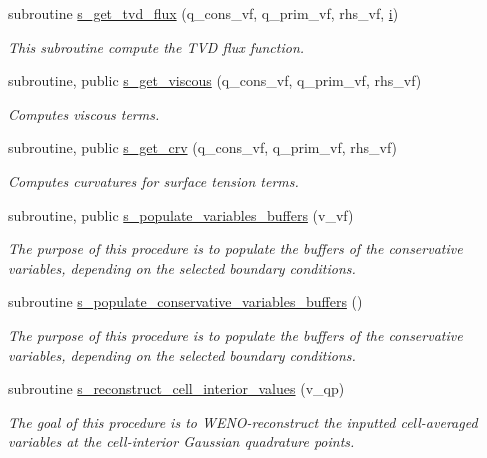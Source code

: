 \begin{DoxyCompactItemize}
\item 
subroutine \hyperlink{namespacem__rhs_a6b6be41d990e9bda7c4830531d7c3470}{s\+\_\+get\+\_\+tvd\+\_\+flux} (q\+\_\+cons\+\_\+vf, q\+\_\+prim\+\_\+vf, rhs\+\_\+vf, \hyperlink{m__rhs_8f90_aaea4baed8fd8b780f6938f0dc1fb0f72}{i})
\begin{DoxyCompactList}\small\item\em This subroutine compute the T\+VD flux function. \end{DoxyCompactList}\item 
subroutine, public \hyperlink{namespacem__rhs_aac41721bd3275fb997f51c1afaebac4a}{s\+\_\+get\+\_\+viscous} (q\+\_\+cons\+\_\+vf, q\+\_\+prim\+\_\+vf, rhs\+\_\+vf)
\begin{DoxyCompactList}\small\item\em Computes viscous terms. \end{DoxyCompactList}\item 
subroutine, public \hyperlink{namespacem__rhs_ae70cf6ec305a948efab279a0bf802095}{s\+\_\+get\+\_\+crv} (q\+\_\+cons\+\_\+vf, q\+\_\+prim\+\_\+vf, rhs\+\_\+vf)
\begin{DoxyCompactList}\small\item\em Computes curvatures for surface tension terms. \end{DoxyCompactList}\item 
subroutine, public \hyperlink{namespacem__rhs_a5735aa0dc9d5759c2056a79d4a8c484b}{s\+\_\+populate\+\_\+variables\+\_\+buffers} (v\+\_\+vf)
\begin{DoxyCompactList}\small\item\em The purpose of this procedure is to populate the buffers of the conservative variables, depending on the selected boundary conditions. \end{DoxyCompactList}\item 
subroutine \hyperlink{namespacem__rhs_a2647dbdf6b09315564ef060e1f49df0d}{s\+\_\+populate\+\_\+conservative\+\_\+variables\+\_\+buffers} ()
\begin{DoxyCompactList}\small\item\em The purpose of this procedure is to populate the buffers of the conservative variables, depending on the selected boundary conditions. \end{DoxyCompactList}\item 
subroutine \hyperlink{namespacem__rhs_a379b85ad4f20d9a3108b3a9df2ef9ff1}{s\+\_\+reconstruct\+\_\+cell\+\_\+interior\+\_\+values} (v\+\_\+qp)
\begin{DoxyCompactList}\small\item\em The goal of this procedure is to W\+E\+N\+O-\/reconstruct the inputted cell-\/averaged variables at the cell-\/interior Gaussian quadrature points. \end{DoxyCompactList}\item 

\end{DoxyCompactItemize}
